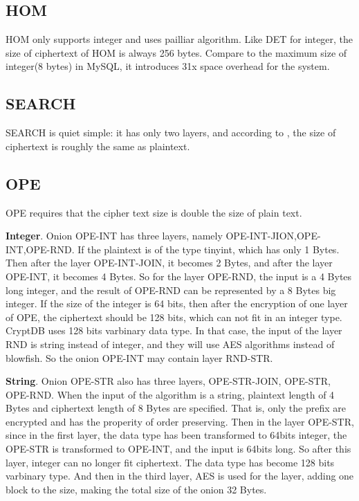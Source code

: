 \subsection{HOM}
HOM only supports integer and uses pailliar algorithm. Like DET for integer, the size of ciphertext of HOM is always 256 bytes. Compare to the maximum size of integer(8 bytes) in MySQL, it introduces 31x space overhead for the system.

\subsection{SEARCH}
SEARCH is quiet simple: it has only two layers, and according to \citep{song2000practical}, the size of ciphertext is roughly the same as plaintext.

\subsection{OPE}
OPE requires that the cipher text size is double the size of plain text. 

\textbf{Integer}. Onion OPE-INT has three layers, namely OPE-INT-JION,OPE-INT,OPE-RND. If the plaintext is of the type tinyint, which has only 1 Bytes. Then after the layer OPE-INT-JOIN, it becomes 2 Bytes, and after the layer OPE-INT, it becomes 4 Bytes. So for the layer OPE-RND, the input is a 4 Bytes long integer, and the result of OPE-RND can be represented by a 8 Bytes big integer. If the size of the integer is 64 bits, then after the encryption of one layer of OPE, the ciphertext should be 128 bits, which can not fit in an integer type. CryptDB uses 128 bits varbinary data type. In that case, the input of the layer RND is string instead of integer, and they will use AES algorithms instead of blowfish. So the onion OPE-INT may contain layer RND-STR.

\textbf{String}. Onion OPE-STR also has three layers, OPE-STR-JOIN, OPE-STR, OPE-RND. When the input of the algorithm is a string, plaintext length of 4 Bytes and  ciphertext length of 8 Bytes are specified. That is, only the prefix are encrypted and has the properity of order preserving. Then in the layer OPE-STR, since in the first layer, the data type has been transformed to 64bits integer, the OPE-STR is transformed to OPE-INT, and the input is 64bits long. So after this layer, integer can no longer fit ciphertext. The data type has become 128 bits varbinary type. And then in the third layer, AES is used for the layer, adding one block to the size, making the total size of the onion 32 Bytes.



